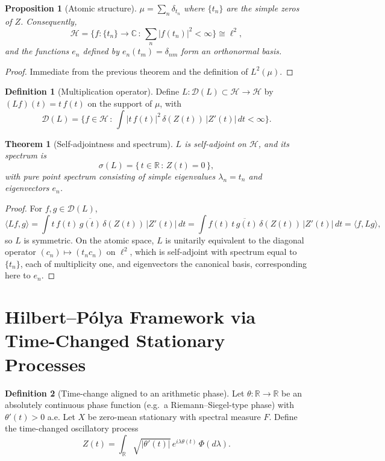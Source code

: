 \documentclass[12pt]{article}
\newtheorem{theorem}{Theorem}
\newtheorem{proposition}{Proposition}
\theoremstyle{definition}
\newtheorem{definition}{Definition}
\theoremstyle{remark}
\begin{document}
\begin{proposition}[Atomic structure]
$\mu=\sum_{n} \delta_{t_n}$ where $\{t_n\}$ are the simple zeros of $Z$. Consequently,
\[
\mathcal{H}=\Big\{ f:\{t_n\}\to\mathbb{C}\,:\, \sum_n |f(t_n)|^2<\infty\Big\}\cong \ell^2,
\]
and the functions $e_n$ defined by $e_n(t_m)=\delta_{nm}$ form an orthonormal basis.
\end{proposition}

\begin{proof}
Immediate from the previous theorem and the definition of $L^2(\mu)$.
\end{proof}

\begin{definition}[Multiplication operator]
Define $L:\mathcal{D}(L)\subset\mathcal{H}\to\mathcal{H}$ by $(Lf)(t)=t\,f(t)$ on the support of $\mu$, with
\[
\mathcal{D}(L)=\Big\{ f\in\mathcal{H}\,:\, \int |t\,f(t)|^2\,\delta(Z(t))\,|Z'(t)|\,dt<\infty\Big\}.
\]
\end{definition}

\begin{theorem}[Self-adjointness and spectrum]
$L$ is self-adjoint on $\mathcal{H}$, and its spectrum is
\[
\sigma(L)=\{\, t\in\mathbb{R}\,:\, Z(t)=0 \,\},
\]
with pure point spectrum consisting of simple eigenvalues $\lambda_n=t_n$ and eigenvectors $e_n$.
\end{theorem}

\begin{proof}
For $f,g\in\mathcal{D}(L)$,
\[
\langle Lf,g\rangle = \int t\,f(t)\,\overline{g(t)}\,\delta(Z(t))\,|Z'(t)|\,dt
= \int f(t)\,\overline{t\,g(t)}\,\delta(Z(t))\,|Z'(t)|\,dt = \langle f,Lg\rangle,
\]
so $L$ is symmetric. On the atomic space, $L$ is unitarily equivalent to the diagonal operator $(c_n)\mapsto (t_n c_n)$ on $\ell^2$, which is self-adjoint with spectrum equal to $\{t_n\}$, each of multiplicity one, and eigenvectors the canonical basis, corresponding here to $e_n$.
\end{proof}

\section{Hilbert--P\'olya Framework via Time-Changed Stationary Processes}

\begin{definition}[Time-change aligned to an arithmetic phase]
Let $\theta:\mathbb{R}\to\mathbb{R}$ be an absolutely continuous phase function (e.g.\ a Riemann--Siegel-type phase) with $\theta'(t)>0$ a.e. Let $X$ be zero-mean stationary with spectral measure $F$. Define the time-changed oscillatory process
\[
Z(t)=\int_{\mathbb{R}} \sqrt{|\theta'(t)|}\,e^{i\lambda \theta(t)}\,\Phi(d\lambda).
\]
\end{definition}
\end{document}
